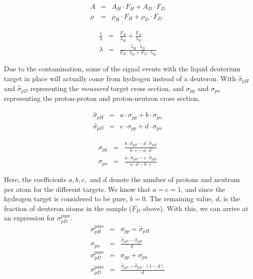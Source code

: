 \noindent\begin{minipage}{.5\linewidth}
	\begin{eqnarray}
	A & = & A_H\cdot F_H + A_D \cdot F_D \\
	\rho & = & \rho_H\cdot F_H + \rho_D \cdot F_D
	\end{eqnarray}
\end{minipage}%
\begin{minipage}{.5\linewidth}
	\begin{eqnarray}
	\frac{1}{\lambda } & = & \frac{F_H}{\lambda_H} + \frac{F_D}{\lambda_D} \\
	\lambda & = & \frac{\lambda_H \cdot \lambda_D}{F_H \cdot \lambda_D + F_D \cdot \lambda_H}	
	\end{eqnarray}
\end{minipage}
\newline

Due to the contamination, some of the signal events with the liquid deuterium target in place will actually come from hydrogen instead of a deuteron. With $\hat{\sigma}_{pH}$ and $\hat{\sigma}_{pD}$ representing the \emph{measured} target cross section, and $\sigma_{pp}$ and $\sigma_{pn}$ representing the proton-proton and proton-neutron cross section, 

\noindent\begin{minipage}{.5\linewidth}
	\begin{eqnarray}
	\hat{\sigma}_{pH} & = & a \cdot \sigma_{pp} + b \cdot \sigma_{pn} \\
	\hat{\sigma}_{pD} & = & c \cdot \sigma_{pp} + d \cdot \sigma_{pn}
	\end{eqnarray}
\end{minipage}%
\begin{minipage}{.5\linewidth}
	\begin{eqnarray}
	\sigma_{pp} & = & \frac{b \cdot \hat{\sigma}_{pD} - d \cdot \hat{\sigma}_{pH}}{b \cdot c - a \cdot d} \\
	\sigma_{pn} & = & \frac{a \cdot \hat{\sigma}_{pD} - c \cdot \hat{\sigma}_{pH}}{a \cdot d - b \cdot c}
	\end{eqnarray}
\end{minipage}
\newline

\noindent Here, the coefficients $a, b, c,$ and $d$ denote the number of protons and neutrons per atom for the different targets. We know that $a=c=1$, and since the hydrogen target is considered to be pure, $b=0$. The remaining value, $d$, is the fraction of deuteron atoms in the sample ($F_D$ above). With this, we can arrive at an expression for $\sigma_{pD}^{\text{pure}}$.
\begin{eqnarray}
\sigma_{pH}^{\text{pure}} & = & \sigma_{pp} = \hat{\sigma}_{pH} \\
\sigma_{pn} & = & \frac{\hat{\sigma}_{pD} - \hat{\sigma}_{pH}}{d} \\
\sigma_{pD}^{\text{pure}} & = & \sigma_{pp} + \sigma_{pn} \\
\sigma_{pD}^{\text{pure}} & = & \frac{\hat{\sigma}_{pD} - \hat{\sigma}_{pH}\cdot (1-d)}{d} \label{eq:contam-corr}
\end{eqnarray}

